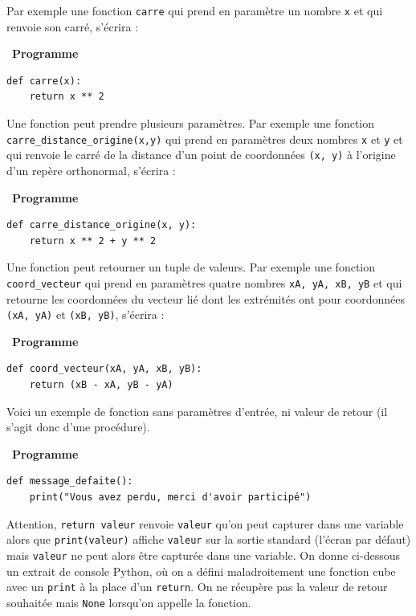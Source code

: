 \documentclass[a4paper, french, 12pt]{article}  %
\newcommand\bcpython{\texttt{[image: /home/fjunier/Maths/python-logo.png]}}
\newcounter{def}
\newcounter{prog}
\newenvironment{programme}[1]
{\par \medskip   \addtocounter{prog}{1} \noindent  
 \begin {bclogo}[noborder = true, barre=zigzag,logo=\bcpython, marge=4] {~\textbf{Programme} \textbf{\theprog} {\itshape #1} }  \par  \bigskip}
{
\end{bclogo}
 \par \bigskip }
\begin{document}
 

Par exemple une fonction \texttt{carre} qui prend en paramètre un nombre \texttt{x} et qui renvoie son carré, s'écrira :

\begin{programme}{}
\begin{lstlisting}[style=rond]
def carre(x):
    return x ** 2
\end{lstlisting}
\end{programme}

Une fonction peut prendre plusieurs paramètres. Par exemple une fonction \verb+carre_distance_origine(x,y)+ qui prend en paramètres deux nombres \texttt{x} et \texttt{y} et qui renvoie le carré de la distance d'un point de coordonnées \texttt{(x, y)} à l'origine d'un repère orthonormal, s'écrira : 

\begin{programme}{}
\begin{lstlisting}[style=rond]
def carre_distance_origine(x, y):
    return x ** 2 + y ** 2
\end{lstlisting}
\end{programme}

Une fonction peut retourner un tuple de valeurs. Par exemple une fonction \verb+coord_vecteur+ qui prend en paramètres quatre nombres \texttt{xA, yA, xB, yB} et qui retourne les coordonnées du vecteur lié dont les extrémités ont pour coordonnées \texttt{(xA, yA)} et \texttt{(xB, yB)}, s'écrira : 

\begin{programme}{}
\begin{lstlisting}[style=rond]
def coord_vecteur(xA, yA, xB, yB):
    return (xB - xA, yB - yA)
\end{lstlisting}
\end{programme}


Voici un exemple de fonction sans paramètres d'entrée, ni  valeur de retour (il s'agit donc d'une procédure). 

\begin{programme}{}
\begin{lstlisting}[style=rond]
def message_defaite():
    print("Vous avez perdu, merci d'avoir participé") 
\end{lstlisting}
\end{programme}

\bcdanger{} Attention, \lstinline+return valeur+ renvoie \texttt{valeur} qu'on peut capturer dans une variable alors que \lstinline+print(valeur)+ affiche \texttt{valeur} sur la sortie standard (l'écran par défaut) mais \texttt{valeur} ne peut alors être capturée dans une variable. On donne ci-dessous un extrait de console Python, où on a défini maladroitement une fonction cube avec un \lstinline+print+ à la place d'un \lstinline+return+. On ne récupère pas la valeur de retour souhaitée mais \lstinline+None+ lorsqu'on appelle la fonction. 
\end{document}
